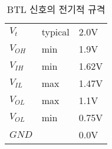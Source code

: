 %
\begin{table}[htbp]
\caption{BTL 신호의 전기적 규격}\label{table:btl-spec}
   \begin{center}
   \begin{tabular}{|l l|l|} \hline
	$V_t$    & typical & 2.0V\\
	$V_{OH}$ & min     & 1.9V\\
	$V_{IH}$ & min     & 1.62V\\
	$V_{IL}$ & max     & 1.47V\\
	$V_{OL}$ & max     & 1.1V\\
	$V_{OL}$ & min     & 0.75V\\
	$GND$    &         & 0.0V\\ \hline
   \end{tabular}
   \end{center}
\end{table}
%
